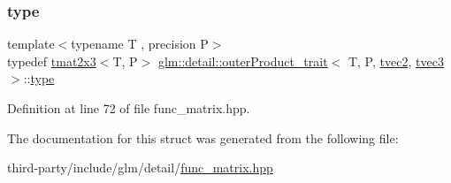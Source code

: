 \subsubsection{\texorpdfstring{type}{type}}
{\footnotesize\ttfamily template$<$typename T , precision P$>$ \\
typedef \hyperlink{structglm_1_1detail_1_1tmat2x3}{tmat2x3}$<$T, P$>$ \hyperlink{structglm_1_1detail_1_1outer_product__trait}{glm\+::detail\+::outer\+Product\+\_\+trait}$<$ T, P, \hyperlink{structglm_1_1detail_1_1tvec2}{tvec2}, \hyperlink{structglm_1_1detail_1_1tvec3}{tvec3} $>$\+::\hyperlink{structglm_1_1detail_1_1outer_product__trait_3_01_t_00_01_p_00_01tvec2_00_01tvec3_01_4_a960af058d12b8de3d79562804f768d0d}{type}}



Definition at line 72 of file func\+\_\+matrix.\+hpp.



The documentation for this struct was generated from the following file\+:\begin{DoxyCompactItemize}
\item 
third-\/party/include/glm/detail/\hyperlink{func__matrix_8hpp}{func\+\_\+matrix.\+hpp}\end{DoxyCompactItemize}
